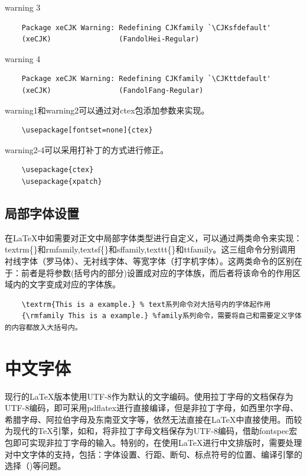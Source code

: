 \documentclass[12pt]{book}
\begin{document}
warning 3
\begin{verbatim}
    Package xeCJK Warning: Redefining CJKfamily `\CJKsfdefault'
    (xeCJK)                (FandolHei-Regular)
\end{verbatim}

warning 4
\begin{verbatim}
    Package xeCJK Warning: Redefining CJKfamily `\CJKttdefault'
    (xeCJK)                (FandolFang-Regular)
\end{verbatim}

warning1和warning2可以通过对ctex包添加参数来实现。
\begin{verbatim}
    \usepackage[fontset=none]{ctex}
\end{verbatim}

warning2-4可以采用打补丁的方式进行修正。
\begin{verbatim}
    \usepackage{ctex}
    \usepackage{xpatch}
\end{verbatim}

\subsection{局部字体设置}

在\LaTeX{}中如需要对正文中局部字体类型进行自定义，可以通过两类命令来实现：textrm\{\}和rmfamily,textsf\{\}和sffamily,texttt\{\}和ttfamily。这三组命令分别调用衬线字体（罗马体）、无衬线字体、等宽字体（打字机字体）。这两类命令的区别在于：前者是将参数(括号内的部分)设置成对应的字体族，而后者将该命令的作用区域内的文字变成对应的字体族。

\begin{verbatim}
    \textrm{This is a example.} % text系列命令对大括号内的字体起作用
    {\rmfamily This is a example.} %family系列命令，需要将自己和需要定义字体的内容都放入大括号内。
\end{verbatim}

\section{中文字体}

现行的\LaTeX{}版本使用UTF-8作为默认的文字编码。使用拉丁字母的文档保存为UTF-8编码，即可采用pdflatex进行直接编译，但是非拉丁字母，如西里尔字母、希腊字母、阿拉伯字母及东南亚文字等，依然无法直接在\LaTeX{}中直接使用。而较为现代的\TeX{}引擎，如\XeTeX{}和\LuaTeX{}，将非拉丁字母文档保存为UTF-8编码，借助fontspec宏包即可实现非拉丁字母的输入。特别的，在使用\LaTeX{}进行中文排版时，需要处理对中文字体的支持，包括：字体设置、行距、断句、标点符号的位置、编译引擎的选择（\XeLaTeX{})等问题。
\end{document}
